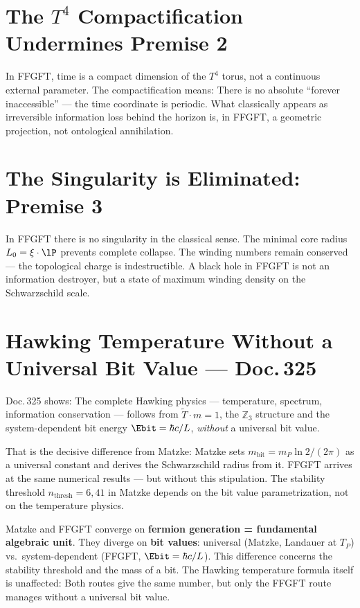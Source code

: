 \section{The $T^4$ Compactification Undermines Premise 2}

In FFGFT, time is a compact dimension of the $T^4$ torus, not a
continuous external parameter. The compactification means: There is
no absolute \enquote{forever inaccessible} --- the time coordinate is
periodic. What classically appears as irreversible information loss behind the
horizon is, in FFGFT, a geometric projection, not
ontological annihilation.

\section{The Singularity is Eliminated: Premise 3}

In FFGFT there is no singularity in the classical sense. The minimal
core radius $L_0 = \xi \cdot \lP$ prevents complete collapse. The
winding numbers remain conserved --- the topological charge is indestructible.
A black hole in FFGFT is not an information destroyer, but a
state of maximum winding density on the Schwarzschild scale.

\section{Hawking Temperature Without a Universal Bit Value --- Doc.\,325}

Doc.\,325 shows: The complete Hawking physics --- temperature,
spectrum, information conservation --- follows from $\tilde{T} \cdot m = 1$,
the $\mathbb{Z}_3$ structure and the system-dependent bit energy
$\Ebit = \hbar c / L$, \emph{without} a universal bit value.

That is the decisive difference from Matzke: Matzke sets
$m_{\text{bit}} = m_P \ln 2 / (2\pi)$ as a universal constant and
derives the Schwarzschild radius from it. FFGFT arrives at the same
numerical results --- but without this stipulation. The stability
threshold $n_{\text{thresh}} = 6{,}41$ in Matzke depends on the bit value parametrization,
not on the temperature physics.

\begin{keyresult}
Matzke and FFGFT converge on \textbf{fermion generation = fundamental
algebraic unit}. They diverge on \textbf{bit values}: universal
(Matzke, Landauer at $T_P$) vs.\ system-dependent (FFGFT, $\Ebit = \hbar c/L$).
This difference concerns the stability threshold and the mass of a bit.
The Hawking temperature formula itself is unaffected: Both routes give
the same number, but only the FFGFT route manages without a universal bit value.
\end{keyresult}
